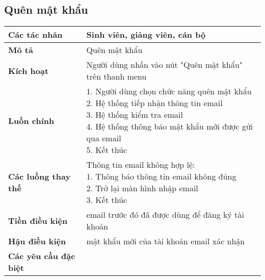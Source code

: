 	\subsection*{Quên mật khẩu}
	\begin{tabular}{|l|p{}|}
		\hline
		\textbf{Các tác nhân}         & Sinh viên, giảng viên, cán bộ                            \\
		\hline
		\textbf{Mô tả}                & Quên mật khẩu                                           \\
		\hline
		\textbf{Kích hoạt}            & Người dùng nhấn vào nút "Quên mật khẩu" trên thanh menu \\
		\hline
		\textbf{Luồn chính}           & \makecell[l]{1. Người dùng chọn chức năng quên mật khẩu \\ 2. Hệ thống tiếp nhận thông tin email \\ 3. Hệ thống kiểm tra email \\ 4. Hệ thống thông báo mật khẩu mới được gửi qua email \\ 5. Kết thúc} \\
		\hline
		\textbf{Các luồng thay thế}   & \makecell[l]{Thông tin email không hợp lệ:              \\ 1. Thông báo thông tin email không đúng \\ 2. Trở lại màn hình nhập email \\ 3. Kết thúc} \\
		\hline
		\textbf{Tiền điều kiện}       & email trước đó đã được dùng để đăng ký tài khoản        \\
		\hline
		\textbf{Hậu điều kiện}        & mật khẩu mới của tài khoản email xác nhận               \\
		\hline
		\textbf{Các yêu cầu đặc biệt} &                                                         \\
		\hline
	\end{tabular}

